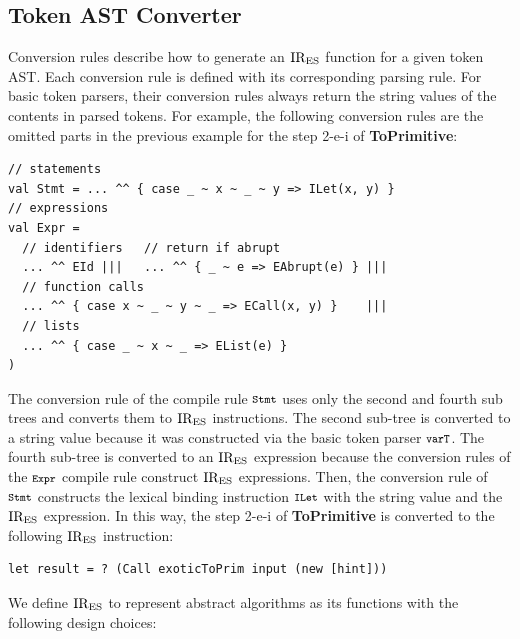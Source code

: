 \subsection{Token AST Converter}
Conversion rules describe how to generate an \( \text{IR}_\text{ES} \) function for a
given token AST.  Each conversion rule is defined with its
corresponding parsing rule.  For basic token parsers, their conversion
rules always return the string values of the contents in parsed tokens.
For example, the following conversion rules are the omitted parts
in the previous example for the step 2-e-i of \textbf{ToPrimitive}:
\begin{lstlisting}[style=myScalastyle]
// statements
val Stmt = ... ^^ { case _ ~ x ~ _ ~ y => ILet(x, y) }
// expressions
val Expr =
  // identifiers   // return if abrupt
  ... ^^ EId |||   ... ^^ { _ ~ e => EAbrupt(e) } |||
  // function calls
  ... ^^ { case x ~ _ ~ y ~ _ => ECall(x, y) }    |||
  // lists
  ... ^^ { case _ ~ x ~ _ => EList(e) }
)
\end{lstlisting}
The conversion rule of the compile rule \( \texttt{\footnotesize Stmt} \) uses only
the second and fourth sub trees and converts them to \( \text{IR}_\text{ES} \)
instructions.  The second sub-tree is converted to a string value
because it was constructed via the basic token parser \( \texttt{\footnotesize varT} \).
The fourth sub-tree is converted to an \( \text{IR}_\text{ES} \) expression
because the conversion rules of the \( \texttt{\footnotesize Expr} \) compile rule
construct \( \text{IR}_\text{ES} \) expressions.  Then, the conversion rule of
\( \texttt{\footnotesize Stmt} \) constructs the lexical binding instruction \( \texttt{\footnotesize ILet} \)
with the string value and the \( \text{IR}_\text{ES} \) expression.  In this way,
the step 2-e-i of \textbf{ToPrimitive} is converted to the following
\( \text{IR}_\text{ES} \) instruction:
\begin{lstlisting}[style=ires]
let result = ? (Call exoticToPrim input (new [hint]))
\end{lstlisting}

We define \( \text{IR}_\text{ES} \) to represent abstract algorithms as its
functions with the following design choices:

